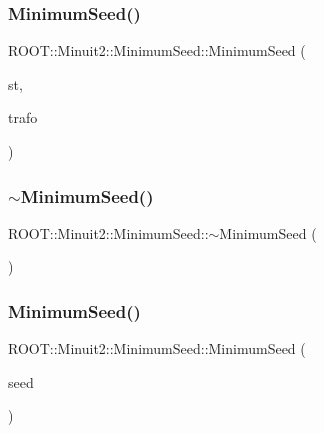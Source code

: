 \subsubsection{\texorpdfstring{MinimumSeed()}{MinimumSeed()}\hspace{0.1cm}{\footnotesize\ttfamily [1/4]}}
{\footnotesize\ttfamily R\+O\+O\+T\+::\+Minuit2\+::\+Minimum\+Seed\+::\+Minimum\+Seed (\begin{DoxyParamCaption}\item[{const \mbox{\hyperlink{classROOT_1_1Minuit2_1_1MinimumState}{Minimum\+State}} \&}]{st,  }\item[{const \mbox{\hyperlink{classROOT_1_1Minuit2_1_1MnUserTransformation}{Mn\+User\+Transformation}} \&}]{trafo }\end{DoxyParamCaption})\hspace{0.3cm}{\ttfamily [inline]}}

\mbox{\label{classROOT_1_1Minuit2_1_1MinimumSeed_a99b95b10842f335d10bf7293f7d91b92}} 
\subsubsection{\texorpdfstring{$\sim$MinimumSeed()}{~MinimumSeed()}\hspace{0.1cm}{\footnotesize\ttfamily [1/2]}}
{\footnotesize\ttfamily R\+O\+O\+T\+::\+Minuit2\+::\+Minimum\+Seed\+::$\sim$\+Minimum\+Seed (\begin{DoxyParamCaption}{ }\end{DoxyParamCaption})\hspace{0.3cm}{\ttfamily [inline]}}

\mbox{\label{classROOT_1_1Minuit2_1_1MinimumSeed_a720f1ac742c7c9c8425bad7b4dc7dd12}} 
\subsubsection{\texorpdfstring{MinimumSeed()}{MinimumSeed()}\hspace{0.1cm}{\footnotesize\ttfamily [2/4]}}
{\footnotesize\ttfamily R\+O\+O\+T\+::\+Minuit2\+::\+Minimum\+Seed\+::\+Minimum\+Seed (\begin{DoxyParamCaption}\item[{const \mbox{\hyperlink{classROOT_1_1Minuit2_1_1MinimumSeed}{Minimum\+Seed}} \&}]{seed }\end{DoxyParamCaption})\hspace{0.3cm}{\ttfamily [inline]}}

